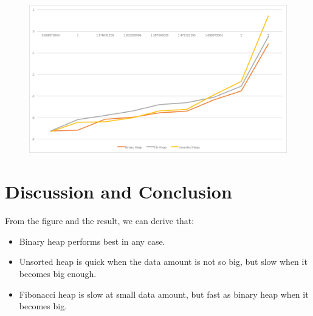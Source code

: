 \documentclass{article}
\begin{document}
\begin{figure}[!htbp]
\centering
\includegraphics[width= \textwidth]{Pic1.png}
\end{figure}

\section{Discussion and Conclusion}
From the figure and the result, we can derive that:
\begin{itemize}
\item Binary heap performs best in any case.
\item Unsorted heap is quick when the data amount is not so big, but slow when it becomes big enough.
\item Fibonacci heap is slow at small data amount, but fast as binary heap when it becomes big.
\end{itemize}
\end{document}
